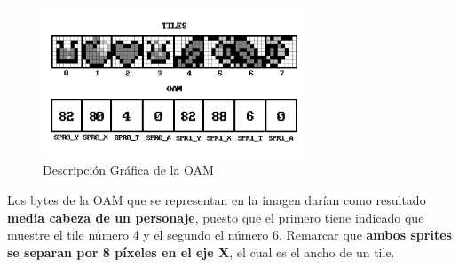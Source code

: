 \begin{figure}[h]
\centering
\includegraphics[width=0.7\textwidth]{include/images/manual/sprites_oam.png}
\caption{Descripción Gráfica de la OAM}
\label{figure:spr_oam}
\end{figure}

Los bytes de la OAM que se representan en la imagen darían como resultado \textbf{media cabeza de un personaje}, puesto que el primero tiene indicado que muestre el tile número 4 y el segundo el número 6. Remarcar que \textbf{ambos sprites se separan por 8 píxeles en el eje X}, el cual es el ancho de un tile.

\cleardoublepage %




